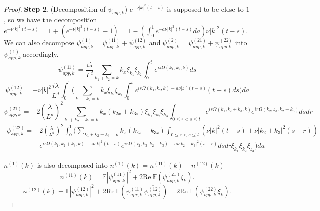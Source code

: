 \begin{proof}
\textbf{Step 2.} (Decomposition of $\psi_{app,k}$) $e^{- \nu|k|^2(t-s)}$ is supposed to be close to $1$, so we have the decomposition $e^{- \nu|k|^2(t-s)}=1+(e^{- \nu|k|^2(t-s)}-1)=1-\left(\int_{0}^1 e^{-a\nu|k|^2(t-s)} da\right) \nu|k|^2(t-s)$. We can also decompose $\psi^{(1)}_{app,k}=\psi^{(11)}_{app,k}+\psi^{(12)}_{app,k}$ and $\psi^{(2)}_{app,k}=\psi^{(21)}_{app,k}+\psi^{(22)}_{app,k}$ into $\psi^{(1)}_{app,k}$ accordingly.
\begin{equation}
    \psi^{(11)}_{app,k}=\frac{i\lambda}{L^{d}} \sum\limits_{k_1+k_2=k} k_{x}\xi_{k_1} \xi_{k_2} \int^{t}_0e^{i s\Omega(k_1,k_2,k)} ds
\end{equation}
\begin{equation}
    \psi^{(12)}_{app,k}=-\nu|k|^2\frac{i\lambda}{L^{d}} \int_{0}^1\Bigg(\sum\limits_{k_1+k_2=k} k_{x}\xi_{k_1} \xi_{k_2} \int^{t}_0e^{i s\Omega(k_1,k_2,k)- a\nu|k|^2(t-s)} (t-s)ds\Bigg) da
\end{equation}
\begin{equation}
\psi^{(21)}_{app,k}=-2\left(\frac{\lambda}{L^{d}}\right)^2 \sum\limits_{k_1+k_2+k_3=k} k_{x}(k_{2x}+k_{3x})\xi_{k_1} \xi_{k_2}\xi_{k_3}\int_{0\le r<s\le t}e^{i s\Omega(k_1,k_2+k_3,k)} e^{i r\Omega(k_2,k_3,k_2+k_3)} dsdr
\end{equation}
\begin{equation}
\begin{split}
    \psi^{(22)}_{app,k}=&2\left(\frac{\lambda}{L^{d}}\right)^2 \int_{0}^1\Bigg(\sum\limits_{k_1+k_2+k_3=k} k_{x}(k_{2x}+k_{3x})\int_{0\le r<s\le t}(\nu|k|^2(t-s)+\nu|k_2+k_3|^2(s-r))
    \\
    & e^{i s\Omega(k_1,k_2+k_3,k)- a\nu|k|^2(t-s)} e^{i r\Omega(k_2,k_3,k_2+k_3)- a\nu|k_2+k_3|^2(s-r)} dsdr\xi_{k_1}\xi_{k_2}\xi_{k_3}\Bigg)da
\end{split}
\end{equation}

$n^{(1)}(k)$ is also decomposed into $n^{(1)}(k)=n^{(11)}(k)+n^{(12)}(k)$
\begin{equation}\label{eq.n(11).threewave}
    n^{(11)}(k)=\mathbb E \left|\psi^{(11)}_{app,k}\right|^2+ 2\text{Re}\  \mathbb E \left(\psi^{(21)}_{app,k}\overline{\xi_k}\right).
\end{equation}
\begin{equation}
    n^{(12)}(k)=\mathbb E \left|\psi^{(12)}_{app,k}\right|^2+2\text{Re}\ \mathbb E \left(\psi^{(11)}_{app,k}\overline{\psi^{(12)}_{app,k}}\right)+ 2\text{Re}\  \mathbb E \left(\psi^{(22)}_{app,k}\overline{\xi_k}\right).
\end{equation}


\end{proof}
